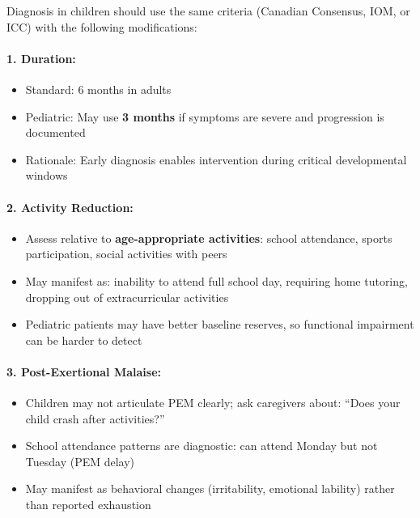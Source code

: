 \begin{requirement}
\label{req:pediatric}
Diagnosis in children should use the same criteria (Canadian Consensus, IOM, or ICC) with the following modifications:

\paragraph{1. Duration:}
\begin{itemize}
    \item Standard: 6 months in adults
    \item Pediatric: May use \textbf{3 months} if symptoms are severe and progression is documented
    \item Rationale: Early diagnosis enables intervention during critical developmental windows
\end{itemize}

\paragraph{2. Activity Reduction:}
\begin{itemize}
    \item Assess relative to \textbf{age-appropriate activities}: school attendance, sports participation, social activities with peers
    \item May manifest as: inability to attend full school day, requiring home tutoring, dropping out of extracurricular activities
    \item Pediatric patients may have better baseline reserves, so functional impairment can be harder to detect
\end{itemize}

\paragraph{3. Post-Exertional Malaise:}
\begin{itemize}
    \item Children may not articulate PEM clearly; ask caregivers about: ``Does your child crash after activities?''
    \item School attendance patterns are diagnostic: can attend Monday but not Tuesday (PEM delay)
    \item May manifest as behavioral changes (irritability, emotional lability) rather than reported exhaustion
\end{itemize}


\end{requirement}
